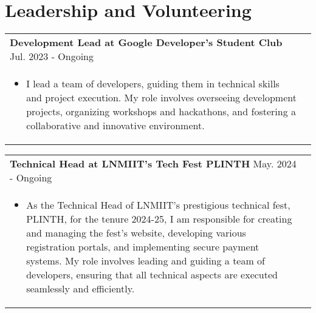 \documentclass[a4paper,8pt]{article}
\begin{document}
\color[HTML]{318CE7}\section{\textbf{Leadership and Volunteering}}
\begin{tabularx}{\linewidth}{ @{}l r@{} }
\color[HTML]{1C033C} \textbf{Development Lead at Google Developer's Student Club} \hfill \color[HTML]{1C033C} Jul. 2023 - Ongoing \\[5pt]
\begin{minipage}[t]{\linewidth}
    \begin{itemize}[nosep,after=\strut, leftmargin=2em, itemsep=2pt]
        \color[HTML]{1C033C}\item  I lead a team of developers, guiding them in technical skills and project execution. My role involves overseeing development projects, organizing
workshops and hackathons, and fostering a collaborative and innovative environment.
    \end{itemize}
\end{minipage}\end{tabularx}

\begin{tabularx}{\linewidth}{ @{}l r@{} }
\color[HTML]{1C033C} \textbf{Technical Head at LNMIIT's Tech Fest PLINTH} \hfill \color[HTML]{1C033C} May. 2024 - Ongoing \\[5pt]
\begin{minipage}[t]{\linewidth}
    \begin{itemize}[nosep,after=\strut, leftmargin=2em, itemsep=2pt]
        \color[HTML]{1C033C}\item As the Technical Head of LNMIIT's prestigious technical fest, PLINTH, for the tenure 2024-25, I am responsible for creating and managing the fest's website, developing various registration portals, and implementing secure payment systems. My role involves leading and guiding a team of developers, ensuring that all technical aspects are executed seamlessly and efficiently.
    \end{itemize}
\end{minipage}\end{tabularx}
\end{document}
